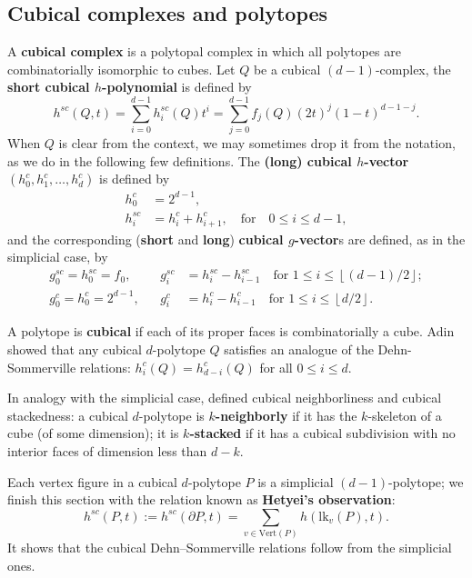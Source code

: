 \documentclass[a4paper,leqno]{article}
\theoremstyle{definition}
\newcommand{\lk}{\mathrm{lk}}
\newcommand{\vertices}{\mathrm{Vert}}
\newcommand{\gc}{g^c}
\newcommand{\hc}{h^c}
\newcommand{\hsc}{h^{sc}}
\newcommand{\gsc}{g^{sc}}
\newcommand{\dhalf}[1]{\left\lfloor #1/2\right\rfloor}
\begin{document}
\subsection{Cubical complexes and polytopes}

A {\bf cubical complex} is a polytopal complex in which all polytopes are combinatorially isomorphic to cubes. Let $Q$ be a cubical $(d-1)$-complex, the {\bf short cubical $h$-polynomial} is defined by
\[\hsc(Q,t)=
\sum_{i=0}^{d-1} \hsc_i(Q) t^i
= \sum_{j=0}^{d-1} f_j(Q) (2t)^j (1-t)^{d-1-j}.
\]
When $Q$ is clear from the context, we may sometimes drop it from the notation, as we do in the following few definitions.
The {\bf (long) cubical $h$-vector} $(\hc_0,\hc_1,\dots ,\hc_d)$ is defined by
\begin{align*}
\hc_0&=2^{d-1},\\
\hsc_i&=\hc_i+\hc_{i+1},\quad\text{for}\quad 0\leq i\leq d-1,
\end{align*}
and the corresponding ({\bf short} and {\bf long}) {\bf cubical $g$-vector}s are defined, as in the simplicial case, by
\begin{align*}
\gsc_0=\hsc_0=f_0,& &  \gsc_i&=\hsc_i -\hsc_{i-1}\quad\text{for } 1\leq i\leq\dhalf{(d-1)}; \\
\gc_0=\hc_0=2^{d-1},& &  \gc_i&=\hc_i -\hc_{i-1}\quad\text{for } 1\leq i\leq\dhalf{d}.
\end{align*}

A polytope is {\bf cubical} if each of its proper faces is combinatorially a cube.
Adin~\cite{Adin96} showed that any cubical $d$-polytope $Q$ satisfies an analogue of the Dehn-Sommerville relations: $\hc_i(Q)=\hc_{d-i}(Q)$ for all $0\le i\le d$.

In analogy with the simplicial case, \cite{BabsBC97} defined cubical neighborliness and cubical stackedness: a cubical $d$-polytope is {\bf $k$-neighborly} if it has the $k$-skeleton of a cube (of some dimension);
it is {\bf $k$-stacked} if it has a cubical subdivision with no interior faces of dimension less than $d-k$.

Each vertex figure in a cubical $d$-polytope $P$ is a simplicial $(d-1)$-polytope;  we finish this section with the relation known as {\bf Hetyei's observation}:
\begin{equation}\label{eq:Hetyei}
\hsc(P,t):=\hsc(\partial P,t)=\sum_{v\in \vertices(P)}h(\lk_v(P),t).
\end{equation}
It shows that the cubical Dehn--Sommerville relations follow from the simplicial ones.
\end{document}
